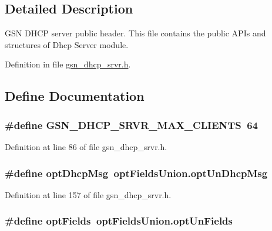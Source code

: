\subsection{Detailed Description}
GSN DHCP server public header. This file contains the public APIs and structures of Dhcp Server module. 

Definition in file \hyperlink{a00482_source}{gsn\_\-dhcp\_\-srvr.h}.



\subsection{Define Documentation}
\hypertarget{a00482_acbcc05b8f8e281cd1d4a25697a4d7fd8}{
\subsubsection[{GSN\_\-DHCP\_\-SRVR\_\-MAX\_\-CLIENTS}]{\setlength{\rightskip}{0pt plus 5cm}\#define GSN\_\-DHCP\_\-SRVR\_\-MAX\_\-CLIENTS~64}}
\label{a00482_acbcc05b8f8e281cd1d4a25697a4d7fd8}


Definition at line 86 of file gsn\_\-dhcp\_\-srvr.h.

\hypertarget{a00482_a15c82ef794d07726fd4fa71e7c66ae50}{
\subsubsection[{optDhcpMsg}]{\setlength{\rightskip}{0pt plus 5cm}\#define optDhcpMsg~optFieldsUnion.optUnDhcpMsg}}
\label{a00482_a15c82ef794d07726fd4fa71e7c66ae50}


Definition at line 157 of file gsn\_\-dhcp\_\-srvr.h.

\hypertarget{a00482_af6676f1b75f7325a0d8f728b2ea24602}{
\subsubsection[{optFields}]{\setlength{\rightskip}{0pt plus 5cm}\#define optFields~optFieldsUnion.optUnFields}}
\label{a00482_af6676f1b75f7325a0d8f728b2ea24602}


